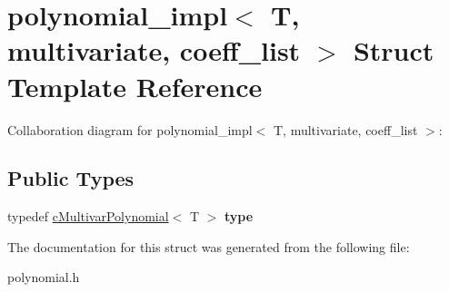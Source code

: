 \hypertarget{structpolynomial__impl_3_01T_00_01multivariate_00_01coeff__list_01_4}{\section{polynomial\-\_\-impl$<$ T, multivariate, coeff\-\_\-list $>$ Struct Template Reference}
\label{structpolynomial__impl_3_01T_00_01multivariate_00_01coeff__list_01_4}
}


Collaboration diagram for polynomial\-\_\-impl$<$ T, multivariate, coeff\-\_\-list $>$\-:
\subsection*{Public Types}
\begin{DoxyCompactItemize}
\item 
\hypertarget{structpolynomial__impl_3_01T_00_01multivariate_00_01coeff__list_01_4_af9bca51d74e05c8c66b075004484a4d5}{typedef \hyperlink{classcMultivarPolynomial}{c\-Multivar\-Polynomial}$<$ T $>$ {\bfseries type}}\label{structpolynomial__impl_3_01T_00_01multivariate_00_01coeff__list_01_4_af9bca51d74e05c8c66b075004484a4d5}

\end{DoxyCompactItemize}


The documentation for this struct was generated from the following file\-:\begin{DoxyCompactItemize}
\item 
polynomial.\-h\end{DoxyCompactItemize}
